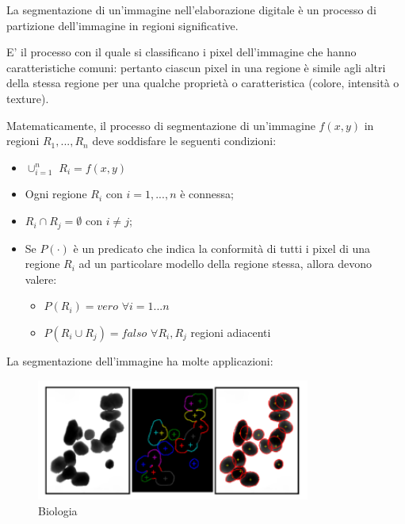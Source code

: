 La segmentazione di un'immagine nell'elaborazione digitale è un processo di
partizione dell'immagine in regioni significative.

\begin{definition}
    E' il processo con il quale si classificano i pixel dell'immagine che hanno caratteristiche comuni: pertanto ciascun pixel in una regione
    è simile agli altri della stessa regione per una qualche proprietà o caratteristica (colore, intensità o texture).
\end{definition}

Matematicamente, il processo di segmentazione di un'immagine $f(x,y)$ in regioni
$R_1,...,R_n$ deve soddisfare le seguenti condizioni:

\begin{itemize}
    \item $\cup^n_{i=1}$ $R_i = f(x,y)$
    \item Ogni regione $R_i$ con $i=1,...,n$ è connessa;
    \item $R_i \cap R_j = \emptyset$ con $i \neq j$;
    \item Se $P(\cdot)$ è un predicato che indica la conformità di tutti i pixel
          di una regione $R_i$ ad un particolare modello della regione
          stessa, allora devono valere:
          \begin{itemize}
              \item $P(R_i) = vero$ $\forall i = 1...n$
              \item $P(R_i \cup R_j) = falso$ $\forall R_i, R_j$ regioni adiacenti
          \end{itemize}
\end{itemize}

La segmentazione dell'immagine ha molte applicazioni:


\begin{figure}[H]
    \centering
    \includegraphics[width=9cm, keepaspectratio]{capitoli/immagini/imgs/biologia.png}
    \caption{Biologia}
\end{figure}

